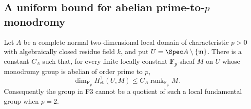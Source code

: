 \subsection{A uniform bound for abelian prime-to-$p$ monodromy}

\begin{proposition}
Let $A$ be a complete normal two-dimensional local domain of
characteristic $p>0$ with algebraically closed residue field $k$,
and put $U=\Spec A\setminus\{\mathfrak m\}$. There is a constant
$C_A$ such that, for every finite locally constant
$\mathbf F_p$-sheaf $M$ on $U$ whose monodromy group is abelian
of order prime to $p$,
\[
 \dim_{\mathbf F_p}H^1_{\mathrm{et}}(U,M)
 \leq C_A\operatorname{rank}_{\mathbf F_p}M.
\]
Consequently the group in F3 cannot be a quotient of such a local
fundamental group when $p=2$.
\end{proposition}

